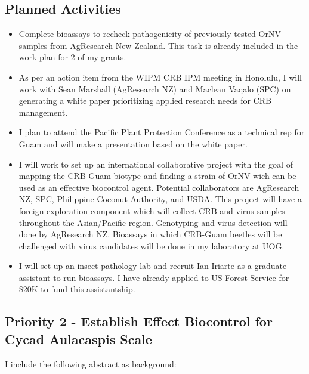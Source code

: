 \documentclass[12pt,oneside,english]{scrbook}
\begin{document}
\subsection{Planned Activities}
\begin{itemize}

\item Complete bioassays to recheck pathogenicity of previously tested OrNV samples from AgResearch New Zealand. This task is already included in the work plan for 2 of my grants.

\item As per an action item from the WIPM CRB IPM meeting in Honolulu, I will work with Sean Marshall (AgResearch NZ) and Maclean Vaqalo (SPC) on generating a white paper prioritizing applied research needs for CRB management.

\item I plan to attend the Pacific Plant Protection Conference as a technical rep for Guam and will make a presentation based on the white paper.

\item I will work to set up an international collaborative project with the goal of mapping the CRB-Guam biotype and finding a strain of OrNV wich can be used as an effective biocontrol agent. Potential collaborators are AgResearch NZ, SPC, Philippine Coconut Authority, and USDA. This project will have a foreign exploration component which will collect CRB and virus samples throughout the Asian/Pacific region. Genotyping and virus detection will done by AgResearch NZ. Bioassays in which CRB-Guam beetles will be challenged with virus candidates will be done in my laboratory at UOG.

\item I will set up an insect pathology lab and recruit Ian Iriarte as a graduate assistant to run bioassays. I have already applied to US Forest Service for \$20K to fund this assistantship.

\end{itemize}

\subsection{Priority 2 - Establish Effect Biocontrol for Cycad Aulacaspis Scale}

I include the following abstract as background:
\end{document}
